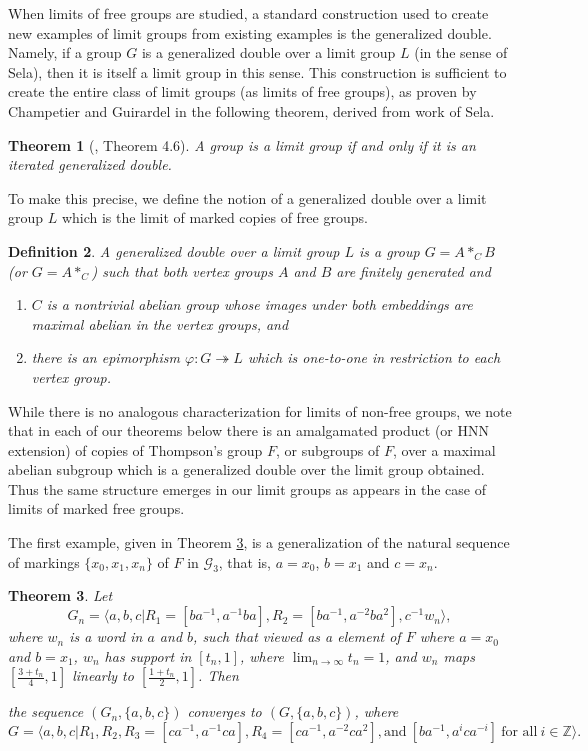 \documentclass[11pt]{amsart}
\newtheorem{theorem}{Theorem}[section]
\newtheorem{definition}[theorem]{Definition}
\begin{document}
When limits of free groups are studied, a standard construction used to create new examples of limit groups from existing examples is the generalized double.  Namely, if a group $G$ is a generalized double over a limit group $L$ (in the sense of Sela), then it is itself a limit group in this sense.  This construction is sufficient to create the entire class of limit groups (as limits of free groups), as proven by Champetier and Guirardel in the following theorem, derived from work of Sela.

\begin{theorem}[\cite{CG}, Theorem 4.6] A group is a limit group if and only if it is an iterated generalized double.
\end{theorem}

To make this precise, we define the notion of a generalized double over a limit group $L$ which is the limit of marked copies of free groups.

\begin{definition}
A generalized double over a limit group $L$ is a group $G = A*_CB$ (or $G=A*_C$) such that both vertex groups $A$ and $B$ are finitely generated and
\begin{enumerate}
\item $C$ is a nontrivial abelian group whose images under both embeddings are maximal abelian in the vertex groups, and
\item there is an epimorphism $\varphi: G \twoheadrightarrow L$ which is one-to-one in restriction to each vertex group.
\end{enumerate}
\end{definition}

While there is no analogous characterization for limits of non-free groups, we note that in each of our theorems below there is an amalgamated product (or HNN extension) of copies of Thompson's group $F$, or subgroups of $F$, over a maximal abelian subgroup which is a generalized double over the limit group obtained.  Thus the same structure emerges in our limit groups as appears in the case of limits of marked free groups.

The first example, given in Theorem \ref{thm:xn}, is a generalization of the natural sequence
of markings $\{x_0,x_1,x_n\}$ of $F$ in ${\mathcal G}_3$, that is, $a=x_0$, $b=x_1$ and $c=x_n$.

\begin{theorem}\label{thm:xn}
Let $$ G_n= \langle a, b, c | R_1=[ba^{-1}, a^{-1}ba],
R_2=[ba^{-1}, a^{-2}ba^2], c^{-1}w_n \rangle,$$ where $w_n$ is a
word in $a$ and $b$, such that viewed as a element of $F$ where
$a=x_0$ and $b=x_1$, $w_n$ has support in $[t_n,1]$, where
$\lim_{n \rightarrow \infty} t_n = 1$, and $w_n$ maps
$[\frac{3+t_n}{4},1]$ linearly to $[\frac{1+t_n}{2},1]$. Then

the sequence $(G_n, \{a,b,c\})$ converges to $(G, \{a,b,c\})$,
where
$$G= \langle a,b,c | R_1, R_2, R_3= [ca^{-1}, a^{-1}ca],
R_4=[ca^{-1}, a^{-2}ca^2], \text{and}~ [ba^{-1}, a^i c a^{-i}]
~\text{for all}~ i \in {\mathbb Z}  \rangle .$$
\end{theorem}
\end{document}
